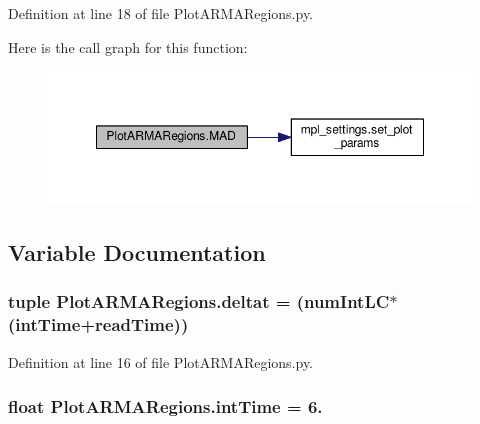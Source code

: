 Definition at line 18 of file Plot\-A\-R\-M\-A\-Regions.\-py.



Here is the call graph for this function\-:\nopagebreak
\begin{figure}[H]
\begin{center}
\leavevmode
\includegraphics[width=350pt]{namespace_plot_a_r_m_a_regions_ab8d32e5943f6391d1de1d360f78a4e1c_cgraph}
\end{center}
\end{figure}




\subsection{Variable Documentation}
\hypertarget{namespace_plot_a_r_m_a_regions_a7b437af6d1c5ce7f40b5f27233d5f4b1}{
\subsubsection[{deltat}]{\setlength{\rightskip}{0pt plus 5cm}tuple Plot\-A\-R\-M\-A\-Regions.\-deltat = ({\bf num\-Int\-L\-C}$\ast$({\bf int\-Time}+{\bf read\-Time}))}}\label{namespace_plot_a_r_m_a_regions_a7b437af6d1c5ce7f40b5f27233d5f4b1}


Definition at line 16 of file Plot\-A\-R\-M\-A\-Regions.\-py.

\hypertarget{namespace_plot_a_r_m_a_regions_a54e4c79468e19409c96e67dfdb482f0a}{
\subsubsection[{int\-Time}]{\setlength{\rightskip}{0pt plus 5cm}float Plot\-A\-R\-M\-A\-Regions.\-int\-Time = 6.}}\label{namespace_plot_a_r_m_a_regions_a54e4c79468e19409c96e67dfdb482f0a}


